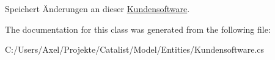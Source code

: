 Speichert Änderungen an dieser \hyperlink{class_products_1_1_model_1_1_entities_1_1_kundensoftware}{Kundensoftware}. 



The documentation for this class was generated from the following file\+:\begin{DoxyCompactItemize}
\item 
C\+:/\+Users/\+Axel/\+Projekte/\+Catalist/\+Model/\+Entities/Kundensoftware.\+cs\end{DoxyCompactItemize}
